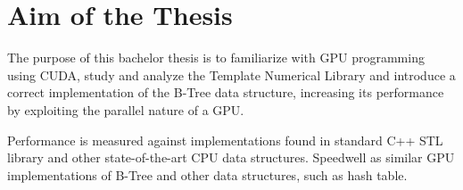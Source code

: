\section{Aim of the Thesis}

The purpose of this bachelor thesis is to familiarize with GPU programming using CUDA, study and analyze the Template Numerical Library and introduce a correct implementation of the B-Tree data structure, increasing its performance by exploiting the parallel nature of a GPU.

Performance is measured against implementations found in standard C++ STL library and other state-of-the-art CPU data structures. Speedwell as similar GPU implementations of B-Tree and other data structures, such as hash table.